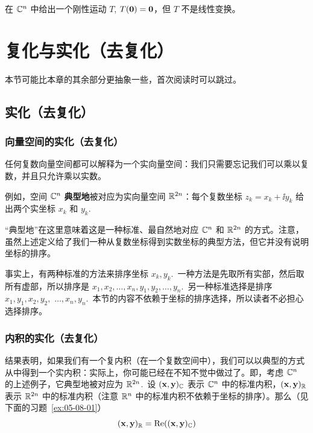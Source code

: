 \begin{problemset}
\item \label{ex:05-07-01} 在 $\mathbb{C}^n$ 中给出一个刚性运动 $T$, $T(\mathbf{0})=\mathbf{0}$，但 $T$ 不是线性变换。
\end{problemset}


\section{复化与实化（去复化）}\label{sec:05-08}

本节可能比本章的其余部分更抽象一些，首次阅读时可以跳过。

\subsection{实化（去复化）}\label{sec:05-08-01}

\subsubsection{向量空间的实化（去复化）}\label{sec:05-08-01-01}

任何复数向量空间都可以解释为一个实向量空间：我们只需要忘记我们可以乘以复数，并且只允许乘以实数。

例如，空间 $\mathbb{C}^n$ \textbf{典型地}被对应为实向量空间 $\mathbb{R}^{2n}$：每个复数坐标 $z_k = x_k + \ii y_k$ 给出两个实坐标 $x_k$ 和 $y_k$.~

“典型地”在这里意味着这是一种标准、最自然地对应 $\mathbb{C}^n$ 和 $\mathbb{R}^{2n}$ 的方式。注意，虽然上述定义给了我们一种从复数坐标得到实数坐标的典型方法，但它并没有说明坐标的排序。

事实上，有两种标准的方法来排序坐标 $x_k, y_k$.~一种方法是先取所有实部，然后取所有虚部，所以排序是 $x_1, x_2, \dots, x_n, y_1, y_2, \dots, y_n$.~另一种标准选择是排序 $x_1, y_1, x_2, y_2, $ $\dots, x_n, y_n$.~本节的内容不依赖于坐标的排序选择，所以读者不必担心选择排序。

\subsubsection{内积的实化（去复化）}\label{sec:05-08-01-02}

结果表明，如果我们有一个复内积（在一个复数空间中），我们可以以典型的方式从中得到一个实内积：实际上，你可能已经在不知不觉中做过了。即，考虑 $\mathbb{C}^n$ 的上述例子，它典型地被对应为 $\mathbb{R}^{2n}$.~设 $(\mathbf{x}, \mathbf{y})_{\mathbb{C}}$ 表示 $\mathbb{C}^n$ 中的标准内积，$(\mathbf{x}, \mathbf{y})_{\mathbb{R}}$ 表示 $\mathbb{R}^{2n}$ 中的标准内积（注意 $\mathbb{R}^n$ 中的标准内积不依赖于坐标的排序）。那么（见下面的习题~\ref{ex:05-08-01}）
\begin{equation}\label{eq:05-08-01}
(\mathbf{x}, \mathbf{y})_{\mathbb{R}} = \operatorname{Re}((\mathbf{x}, \mathbf{y})_{\mathbb{C}})
\end{equation}

